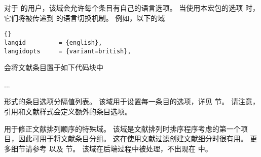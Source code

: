 \begin{fieldlist}

对于  的用户，该域会允许每个条目有自己的语言选项。
当使用本宏包的选项  时，它们将被传递到  的语言切换机制。
例如，以下的域
\begin{lstlisting}[style=bibtex]{}
langid         = {english},
langidopts     = {variant=british},
\end{lstlisting}
%
会将文献条目置于如下代码块中
\begin{ltxexample}
\english[variant=british]
...
\endenglish
\end{ltxexample}
%




\keyval 形式的条目选项分隔值列表。
该域用于设置每一条目的选项，详见  节。
请注意，引用和文献样式会定义额外的条目选项。




用于修正文献排列顺序的特殊域。
该域是文献排列时排序程序考虑的第一个项目，因此可用于将文献条目分组。
这在使用文献过滤创建文献细分时很有用。
更多细节请参考  以及  节。
该域在后端过程中被处理，不出现在  中。





\end{fieldlist}
